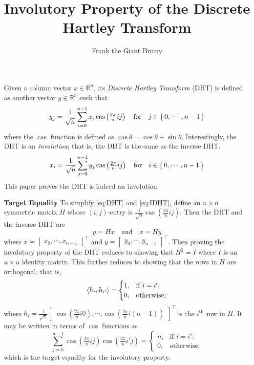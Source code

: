 \documentclass[12pt]{article}
\DeclareMathOperator{\cas}{cas}
\newcommand{\trans}[1]{\ensuremath{{#1}^\intercal}}
\begin{document}
\title{Involutory Property of the Discrete Hartley Transform}
\author{Frank the Giant Bunny}
\maketitle

Given a column vector $x\in\mathbb{R}^n$, its \emph{Discrete Hartley Transform}
(DHT) is defined as another vector $y\in\mathbb{R}^n$ such that
\begin{equation}
  y_j = \frac{1}{\sqrt n}\sum_{i=0}^{n-1}x_i
  \cas\left(\tfrac{2\pi}{n}ij\right)
  \quad\text{for}\quad j\in\set{0,\cdots,n-1}
  \label{eq:DHT}
\end{equation}
where the $\cas$ function is defined as $\cas\theta = \cos\theta + \sin\theta$.
Interestingly, the DHT is an \emph{involution}; that is, the DHT is the same as the
inverse DHT.
\begin{equation}
  x_i = \frac{1}{\sqrt n}\sum_{j=0}^{n-1}y_j
  \cas\left(\tfrac{2\pi}{n}ij\right)
  \quad\text{for}\quad i\in\set{0,\cdots,n-1}
  \label{eq:IDHT}
\end{equation}
This paper proves the DHT is indeed an involution.

\noindent\textbf{\textsf{Target Equality}}\quad
To simplify \eqref{eq:DHT} and \eqref{eq:IDHT},
define an $n\times n$ symmetric matrix $H$ whose $(i,j)$-entry is
$\frac{1}{\sqrt n}\cas\left(\frac{2\pi}{n}ij\right)$.
Then the DHT and the inverse DHT are 
\begin{equation*}
  y = Hx
  \quad\text{and}\quad
  x = Hy
\end{equation*}
where $x=\trans{
  \begin{bmatrix}x_0,\cdots,x_{n-1}\end{bmatrix}
}$ and
$y=\trans{
  \begin{bmatrix}y_0,\cdots,y_{n-1}\end{bmatrix}
}$.
Then proving the involutory property of the DHT reduces to showing that 
$H^2 = I$ where $I$ is an $n\times n$ identity matrix.
This further reduces to showing that the rows in $H$ are orthogonal;
that is,
\begin{equation*}
  \braket{h_i, h_{i'}} = 
  \begin{cases}
    1, &\text{if $i=i'$;} \\
    0, &\text{otherwise;}
  \end{cases}
\end{equation*}
where $h_i=\tfrac{1}{\sqrt n}\trans{
  \begin{bmatrix}
    \cas\left(\tfrac{2\pi}{n}i0\right),
    \cdots,
    \cas\left(\tfrac{2\pi}{n}i(n-1)\right)
  \end{bmatrix}}$
is the $i^{\mathrm{th}}$ row in $H$.
It may be written in terms of $\cas$ functions as
\begin{equation}
  \sum_{j=0}^{n-1}
  \cas\left(\tfrac{2\pi}{n}ij\right) \cas\left(\tfrac{2\pi}{n}i'j\right)
  =
  \begin{cases}
    n, &\text{if $i=i'$;} \\
    0, &\text{otherwise;}
  \end{cases}
  \label{eq:target}
\end{equation}
which is the target equality for the involutory property.
\end{document}
